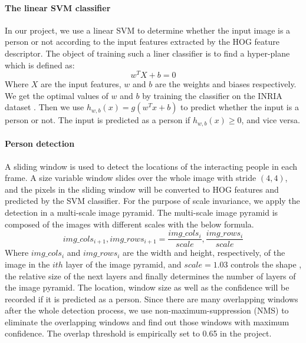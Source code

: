 \paragraph*{The linear SVM classifier}
In our project, we use a linear SVM to determine whether the input image is a person or not according to the input features extracted by the HOG feature descriptor. The object of training such a liner classifier is to find a hyper-plane which is defined as:
\begin{equation}
	w^TX + b = 0
\end{equation}
Where \(X\) are the input features, \(w\) and \(b\) are the weights and biases respectively. We get the optimal values of \(w\) and \(b\) by training the classifier on the INRIA dataset \cite{inria_person}. Then we use \(h_{w,b}(x) = g(w^Tx+b)\) to predict whether the input is a person or not. The input is predicted as a person if \(h_{w,b}(x) \geq 0 \), and vice versa.

\paragraph*{Person detection} 
A sliding window is used to detect the locations of the interacting people in each frame. A size variable window slides over the whole image with stride \((4,4)\), and the pixels in the sliding window will be converted to HOG features and predicted by the SVM classifier. For the purpose of scale invariance, we apply the detection in a multi-scale image pyramid. The multi-scale image pyramid is composed of the images with different scales with the below formula. 
\begin{equation}
	img\_cols_{i+1}, img\_rows_{i+1} = \frac{img\_cols_i}{scale}, \frac{img\_rows_i}{scale}
\end{equation}
Where \(img\_cols_i\) and \(img\_rows_i\) are the width and height, respectively, of the image in the \(ith\) layer of the image pyramid, and \(scale = 1.03\) controls the shape , the relative size of the next layers and finally determines the number of layers of the image pyramid. 
The location, window size as well as the confidence will be recorded if it is predicted as a person. Since there are many overlapping windows after the whole detection process, we use non-maximum-suppression (NMS) to eliminate the overlapping windows and find out those windows with maximum confidence. The overlap threshold is empirically set to 0.65 in the project. 

